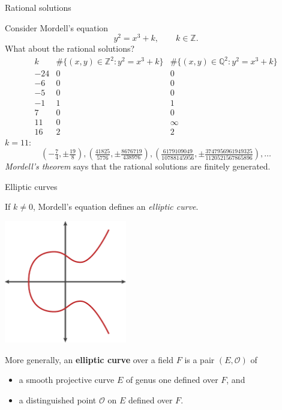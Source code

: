\documentclass[10pt]{beamer}
\begin{document}
\begin{frame}[t]{Rational solutions}

Consider Mordell's equation
$$ y^2 = x^3 + k, \qquad k \in \mathbb{Z}. $$
What about the rational solutions?
$$
\begin{array}{c|c|c}
k & \#\{(x, y) \in \mathbb{Z}^2 : y^2 = x^3 + k\} & \#\{(x, y) \in \mathbb{Q}^2 : y^2 = x^3 + k\} \\
\hline
-24 & 0 & 0 \\
-6 & 0 & 0 \\
-5 & 0 & 0 \\
-1 & 1 & 1 \\
7 & 0 & 0 \\
11 & 0 & \infty \\
16 & 2 & 2
\end{array}
$$
$ k = 11 $:
$$ (-\tfrac{7}{4}, \pm\tfrac{19}{8}), (\tfrac{41825}{5776}, \pm\tfrac{8676719}{438976}), (\tfrac{6179109049}{10788145956}, \pm\tfrac{3747956961949325}{1120521567865896}), \dots $$
\emph{Mordell's theorem} says that the rational solutions are finitely generated.

\end{frame}

\begin{frame}[t]{Elliptic curves}

If $ k \ne 0 $, Mordell's equation defines an \emph{elliptic curve}.

\begin{center}
\includegraphics[width=0.4\textwidth]{ellipticcurves.png}
\end{center}

More generally, an \textbf{elliptic curve} over a field $ F $ is a pair $ (E, \mathcal{O}) $ of
\begin{itemize}
\item a smooth projective curve $ E $ of genus one defined over $ F $, and
\item a distinguished point $ \mathcal{O} $ on $ E $ defined over $ F $.
\end{itemize}

\end{frame}
\end{document}
